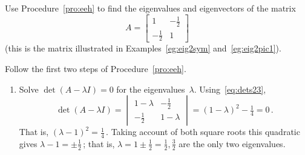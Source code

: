 \begin{example} \label{eg:2evals}
Use Procedure~\ref{pro:eeh} to find the eigenvalues and eigenvectors of the matrix
\begin{equation*}
A=\begin{bmatrix} 1&-\frac12\\-\frac12&1 \end{bmatrix}
\end{equation*}
(this is the matrix illustrated in Examples~\ref{eg:eig2sym} and~\ref{eg:eig2pic1}).
\begin{solution} Follow the first two steps of Procedure~\ref{pro:eeh}.
\begin{enumerate}
\item Solve \(\det(A-\lambda I)=0\) for the eigenvalues~\(\lambda\).
Using~\eqref{eq:dets23},
\begin{equation*}
\det(A-\lambda I)=\begin{vmatrix} 1-\lambda&-\frac12\\
-\frac12&1-\lambda \end{vmatrix}
=(1-\lambda)^2-\tfrac14=0\,.
\end{equation*}
That is, \((\lambda-1)^2=\frac14\)\,.  Taking account of both square roots this quadratic gives \(\lambda-1=\pm\frac12\)\,; that is, \(\lambda=1\pm\frac12=\frac12,\frac32\) are the only two eigenvalues.


\end{enumerate}
\end{solution}
\end{example}
